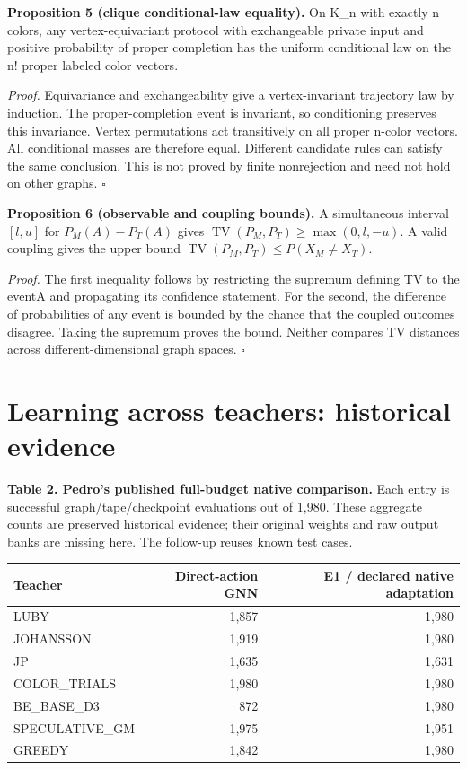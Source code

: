 \documentclass[
  11pt,
]{article}
\newcounter{none} %
\begin{document}
\textbf{Proposition 5 (clique conditional-law equality).} On K\_n with
exactly n colors, any vertex-equivariant protocol with exchangeable
private input and positive probability of proper completion has the
uniform conditional law on the n! proper labeled color vectors.

\emph{Proof.} Equivariance and exchangeability give a vertex-invariant
trajectory law by induction. The proper-completion event is invariant,
so conditioning preserves this invariance. Vertex permutations act
transitively on all proper n-color vectors. All conditional masses are
therefore equal. Different candidate rules can satisfy the same
conclusion. This is not proved by finite nonrejection and need not hold
on other graphs. \(\square\)

\textbf{Proposition 6 (observable and coupling bounds).} A simultaneous
interval \([l,u]\) for \(P_M(A)-P_T(A)\) gives
\(\operatorname{TV}(P_M,P_T)\ge\max(0,l,-u)\). A valid coupling gives
the upper bound \(\operatorname{TV}(P_M,P_T)\le P(X_M\ne X_T)\).

\emph{Proof.} The first inequality follows by restricting the supremum
defining TV to the eventA and propagating its confidence statement. For
the second, the difference of probabilities of any event is bounded by
the chance that the coupled outcomes disagree. Taking the supremum
proves the bound. Neither compares TV distances across
different-dimensional graph spaces. \(\square\)

\section{Learning across teachers: historical
evidence}\label{learning-across-teachers-historical-evidence}

\textbf{Table 2. Pedro's published full-budget native comparison.} Each
entry is successful graph/tape/checkpoint evaluations out of 1,980.
These aggregate counts are preserved historical evidence; their original
weights and raw output banks are missing here. The follow-up reuses
known test cases.

{\def\LTcaptype{none} %
\begin{longtable}[]{@{}lrr@{}}
\toprule\noalign{}
Teacher & Direct-action GNN & E1 / declared native adaptation \\
\midrule\noalign{}
\endhead
\bottomrule\noalign{}
\endlastfoot
LUBY & 1,857 & 1,980 \\
JOHANSSON & 1,919 & 1,980 \\
JP & 1,635 & 1,631 \\
COLOR\_TRIALS & 1,980 & 1,980 \\
BE\_BASE\_D3 & 872 & 1,980 \\
SPECULATIVE\_GM & 1,975 & 1,951 \\
GREEDY & 1,842 & 1,980 \\
\end{longtable}
}
\end{document}
